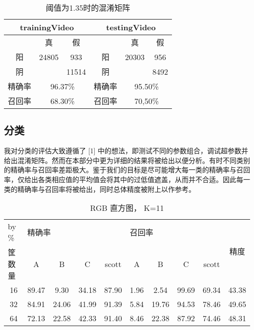 \documentclass{article}
\begin{document}
\begin{table}[]
\centering
\begin{tabular}{|c|c|c|c|c|c|}
\hline
\multicolumn{3}{|c|}{trainingVideo} & \multicolumn{3}{c|}{testingVideo} \\ \hline
 & 真 & 假 &  & 真 & 假 \\ \hline
阳 & 24805 & 933 & 阳 & 20303 & 956 \\ \hline
阴 &  & 11514 & 阴 &  & 8492 \\ \hline
精确率 & \multicolumn{2}{c|}{96.37\%} & 精确率 & \multicolumn{2}{c|}{95.50\%} \\ \hline
召回率 & \multicolumn{2}{c|}{68.30\%} & 召回率 & \multicolumn{2}{c|}{70,50\%} \\ \hline
\end{tabular}
\caption{阈值为1.35时的混淆矩阵}
\end{table}
\subsection{分类}
我对分类的评估大致遵循了 [1] 中的想法，即测试不同的参数组合，调试超参数并给出混淆矩阵。然而在本部分中更为详细的结果将被给出以便分析。有时不同类别的精确率与召回率差距极大。鉴于我们的目标是尽可能增大每一类的精确率与召回率，仅给出各类相应值的平均值会将其中的过低值遮盖，从而并不合适。因此每一类的精确率与召回率将被给出，同时总体精度被附上以作参考。
\begin{table}[]
\centering
\begin{tabular}{|c|c|c|c|c|c|c|c|c|c|}
\hline
\multicolumn{1}{|l|}{by \%} & \multicolumn{4}{l|}{精确率} & \multicolumn{4}{l|}{召回率} & \multirow{2}{*}{精度} \\ \cline{1-9}
\multicolumn{1}{|l|}{筐数量} & A & B & C & scott & A & B & C & scott &  \\ \hline
16 & 89.47 & 9.30 & 34.18 & 87.90 & 1.96 & 2.54 & 99.69 & 69.34 & 43.38 \\ \hline
32 & 84.91 & 24.06 & 41.99 & 91.39 & 5.84 & 19.76 & 94.53 & 78.46 & 49.65 \\ \hline
64 & 72.13 & 22.58 & 42.33 & 91.40 & 8.46 & 22.38 & 87.92 & 74.46 & 48.31 \\ \hline
\end{tabular}
\caption{RGB 直方图， K=11}
\end{table}
\end{document}

